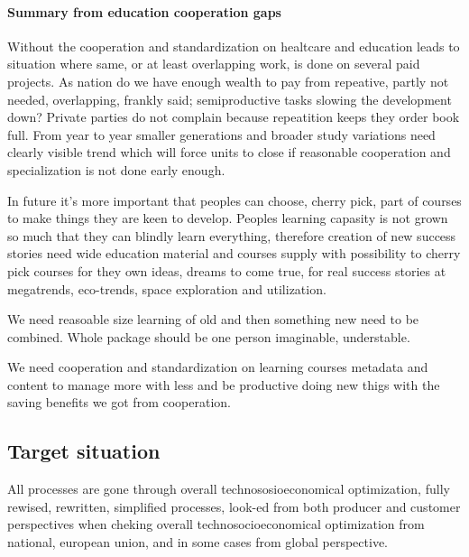 \paragraph{Summary from education cooperation gaps}
\label{education_cooperation_gaps}

Without the cooperation and standardization on healtcare and education leads
to situation where same, or at least overlapping work, is done on several paid
projects. As nation do we have enough wealth to pay from repeative, partly not
needed, overlapping, frankly said; semi\-productive tasks slowing the
development down? Private parties do not complain because repeatition keeps
they order book full. From year to year smaller generations and broader study
variations need clearly visible trend which will force units to close if
reasonable cooperation and specialization is not done early enough.

In future it's more important that peoples can choose, cherry pick, part of
courses to make things they are keen to develop. Peoples learning capasity
is not grown so much that they can blindly learn everything, therefore
creation of new success stories need wide education material and courses
supply with possibility to cherry pick courses for they own ideas, dreams
to come true, for real success stories at megatrends, eco-trends, space
exploration and utilization.

We need reasoable size learning of old and then something new need to
be combined. Whole package should be one person imaginable, understable.

We need cooperation and standardization on learning courses metadata and
content to manage more with less and be productive doing new thigs with
the saving benefits we got from cooperation.

\subsection{Target situation}
\label{target_situation}

All processes are gone through overall technososioeconomical optimization,
fully rewised, rewritten, simplified processes, look-ed from both producer and
customer perspectives when cheking overall technosocioeconomical optimization
from national, european union, and in some cases from global perspective.

